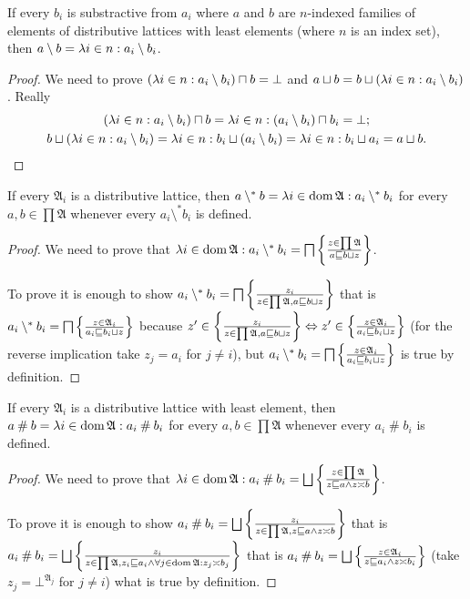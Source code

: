 \begin{prop}
If every $b_{i}$ is substractive from $a_{i}$ where $a$ and $b$
are $n$-indexed families of elements of distributive lattices with least elements
(where $n$ is an index set), then $a\setminus b=\lambda i\in n:a_{i}\setminus b_{i}$.\end{prop}
\begin{proof}
We need to prove $(\lambda i\in n:a_{i}\setminus b_{i})\sqcap b=\bot$
and $a\sqcup b=b\sqcup(\lambda i\in n:a_{i}\setminus b_{i})$. Really
\begin{gather*}
(\lambda i\in n:a_{i}\setminus b_{i})\sqcap b=\lambda i\in n:(a_{i}\setminus b_{i})\sqcap b_{i}=\bot;\\
b\sqcup(\lambda i\in n:a_{i}\setminus b_{i})=\lambda i\in n:b_{i}\sqcup(a_{i}\setminus b_{i})=\lambda i\in n:b_{i}\sqcup a_{i}=a\sqcup b.
\end{gather*}
\end{proof}
\begin{prop}
If every $\mathfrak{A}_{i}$ is a distributive lattice, then $a\setminus^{\ast}b=\lambda i\in\operatorname{dom}\mathfrak{A}:a_{i}\setminus^{\ast}b_{i}$
for every $a,b\in\prod\mathfrak{A}$ whenever every $a_{i}\setminus^{\ast}b_{i}$
is defined.\end{prop}
\begin{proof}
We need to prove that $\lambda i\in\operatorname{dom}\mathfrak{A}:a_{i}\setminus^{\ast}b_{i}=\bigsqcap\left\{ \frac{z\in\prod\mathfrak{A}}{a\sqsubseteq b\sqcup z}\right\}$.

To prove it is enough to show $a_{i}\setminus^{\ast}b_{i}=\bigsqcap\left\{ \frac{z_{i}}{z\in\prod\mathfrak{A},a\sqsubseteq b\sqcup z}\right\}$
that is $a_{i}\setminus^{\ast}b_{i}=\bigsqcap\left\{ \frac{z\in\mathfrak{A}_{i}}{a_{i}\sqsubseteq b_{i}\sqcup z}\right\}$
because $z'\in\left\{ \frac{z_{i}}{z\in\prod\mathfrak{A},a\sqsubseteq b\sqcup z}\right\} \Leftrightarrow z'\in\left\{ \frac{z\in\mathfrak{A}_{i}}{a_{i}\sqsubseteq b_{i}\sqcup z}\right\}$
(for the reverse implication take $z_{j}=a_{i}$ for $j\neq i$),
but $a_{i}\setminus^{\ast}b_{i}=\bigsqcap\left\{ \frac{z\in\mathfrak{A}_{i}}{a_{i}\sqsubseteq b_{i}\sqcup z}\right\}$ is true by definition.\end{proof}
\begin{prop}
If every $\mathfrak{A}_{i}$ is a distributive lattice with least
element, then $a\mathbin\#b=\lambda i\in\operatorname{dom}\mathfrak{A}:a_{i}\mathbin\#b_{i}$
for every $a,b\in\prod\mathfrak{A}$ whenever every $a_{i}\mathbin\#b_{i}$
is defined.\end{prop}
\begin{proof}
We need to prove that $\lambda i\in\operatorname{dom}\mathfrak{A}:a_{i}\mathbin\#b_{i}=\bigsqcup\left\{ \frac{z\in\prod\mathfrak{A}}{z\sqsubseteq a\land z\asymp b}\right\}$.

To prove it is enough to show $a_{i}\mathbin\#b_{i}=\bigsqcup\left\{ \frac{z_{i}}{z\in\prod\mathfrak{A},z\sqsubseteq a\land z\asymp b}\right\}$
that is $a_{i}\mathbin\#b_{i}=\bigsqcup\left\{ \frac{z_i}{z\in\prod\mathfrak{A},z_i\sqsubseteq a_{i}\land\forall j\in\operatorname{dom}\mathfrak{A}:z_{j}\asymp b_{j}}\right\}$
that is $a_{i}\mathbin\#b_{i}=\bigsqcup\left\{ \frac{z\in\mathfrak{A}_{i}}{z\sqsubseteq a_{i}\land z\asymp b_{i}}\right\}$
(take $z_{j}=\bot^{\mathfrak{A}_j}$ for $j\ne i$) what is true by definition.\end{proof}
